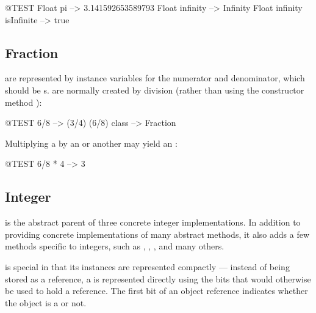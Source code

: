 \documentclass[a4paper,10pt,twoside]{book}
\begin{document}
\begin{code}{@TEST}
Float pi                      --> 3.141592653589793
Float infinity               --> Infinity
Float infinity isInfinite --> true
\end{code}

\subsection{Fraction}

 are represented by instance variables for the numerator and denominator, which should be s.  are normally created by  division (rather than using the constructor method ):

\begin{code}{@TEST}
6/8             --> (3/4)
(6/8) class --> Fraction
\end{code}

Multiplying a  by an  or another  may yield an :

\begin{code}{@TEST}
6/8 * 4 --> 3
\end{code}


\subsection{Integer}

 is the abstract parent of three concrete integer implementations. In addition to providing concrete implementations of many abstract  methods, it also adds a few methods specific to integers, such as , , ,  and many others.

 is special in that its instances are represented compactly --- instead of being stored as a reference, a  is represented directly using the bits that would otherwise be used to hold a reference.  The first bit of an object reference indicates whether the object is a  or not.
\end{document}
